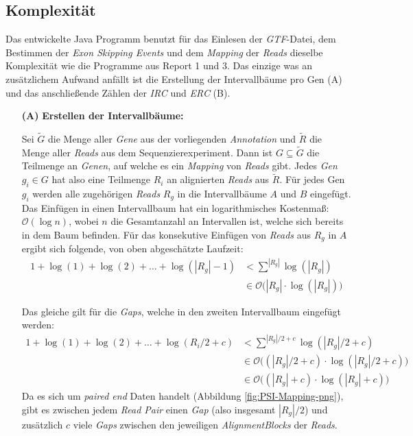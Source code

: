 \documentclass[12pt]{article}
\begin{document}
\subsection{Komplexität}\label{sec:Komplexität}
Das entwickelte Java Programm benutzt für das Einlesen der \textit{GTF}-Datei, dem Bestimmen
der \textit{Exon Skipping Events} und dem \textit{Mapping} der \textit{Reads} dieselbe Komplexität
wie die Programme aus Report 1 und 3.
Das einzige was an zusätzlichem Aufwand anfällt ist die Erstellung der Intervallbäume pro Gen (A) und das 
anschlie\ss ende Zählen der \textit{IRC} und \textit{ERC} (B).
\begin{itemize}
    \item[\textbf{(A)}] \textbf{Erstellen der Intervallbäume:} 

        Sei $\tilde G$ die Menge aller \textit{Gene} aus der vorliegenden \textit{Annotation} und
        $\tilde R$ die Menge aller \textit{Reads} aus dem Sequenzierexperiment.
        Dann ist $G \subseteq \tilde G$ die Teilmenge an \textit{Genen}, auf 
        welche es ein \textit{Mapping} von \textit{Reads} gibt.
        Jedes \textit{Gen} $g_{i} \in  G$ hat also eine Teilmenge $R_{i}$ an
        alignierten \textit{Reads} aus $\tilde R$.
        Für jedes Gen $g_{i}$ werden alle zugehörigen \textit{Reads} $R_{g}$
        in die Intervallbäume $A$ und $B$ eingefügt.
        Das Einfügen in einen Intervallbaum hat ein logarithmisches 
        Kostenma\ss : $\mathcal{O}(\log n)$, wobei $n$ die Gesamtanzahl an
        Intervallen ist, welche sich bereits in dem Baum befinden.
        Für das konsekutive Einfügen von \textit{Reads} aus $R_{g}$ in $A$ ergibt sich folgende, von 
        oben abgeschätzte Laufzeit:
        \begin{align*}
            1  + \log(1) + \log(2) + \dots + \log(|R_{g}| - 1) &< \sum^{|R_{g}|} \log (|R_{g}|) \\
                                                               &\in \mathcal{O}\Big(|R_{g}| \cdot \log(|R_{g}|)\Big)
        \end{align*}

        Das gleiche gilt für die \textit{Gaps}, welche in den zweiten Intervallbaum eingefügt werden:
        \begin{align*}
        1  + \log(1) + \log(2) + \dots + \log(R_{i}/2 + c) &< \sum^{|R_{g}|/2 + c} \log (|R_{g}|/2 + c) \\
                                                           &\in \mathcal{O}\Big((|R_{g}|/2 +c) \cdot \log(|R_{g}|/2 + c)\Big) \\
                                                           &\in \mathcal{O}\Big((|R_{g}| + c) \cdot \log(|R_{g}| + c)\Big)
        \end{align*}
        Da es sich um \textit{paired end} Daten handelt (Abbildung \ref{fig:PSI-Mapping-png}), gibt es zwischen jedem \textit{Read Pair} einen \textit{Gap}
        (also insgesamt $|R_{g}|/2$) und zusätzlich $c$ viele \textit{Gaps} zwischen den jeweiligen
        \textit{AlignmentBlocks} der \textit{Reads}.


\end{itemize}
\end{document}
